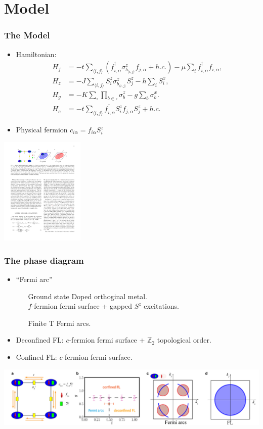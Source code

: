 \documentclass[xcolor=table, 10pt, aspectratio=43]{beamer}
\begin{document}
\section{Model}

\begin{frame}
	\frametitle{The Model}
\begin{itemize}
\item Hamiltonian:
	\begin{align*}
	H_f &= -t\sum_{\langle i,j \rangle} (f^{\dagger}_{i,\alpha} \sigma^{z}_{b_{\langle i,j \rangle}}f_{j,\alpha} + h.c.) -\mu\sum_{i}f^{\dagger}_{i,\alpha}f_{i,\alpha}, \nonumber\\
	H_{z} &= -J \sum_{\langle i,j \rangle} S^{z}_{i} \sigma^{z}_{b_{\langle i,j \rangle}} S^{z}_{j} - h \sum_{i} S^{x}_{i}, \nonumber\\
	H_{g} &= -K \sum_{\square}\prod_{b\in\square} \sigma^{z}_{b} - g\sum_{b} \sigma^{x}_{b}.\\
	H_{c} &= -t \sum_{\langle i,j\rangle} f^{\dagger}_{i,\alpha}S^{z}_{i}f_{j,\alpha}S^{z}_{j} + h.c.
\end{align*}
\item Physical fermion $c_{i\alpha} = f_{i\alpha}S_i^z$
\end{itemize}
\begin{center}
	\includegraphics[width=4cm]{model_l}
\end{center}
\end{frame}

\begin{frame}
	\frametitle{The phase diagram}
	\begin{itemize}
		\item ``Fermi arc''
		\begin{itemize}
			\item[Ground state] Doped orthoginal metal.\\
			$f$-fermion fermi surface + gapped $S^z$ excitations.
			\item[Finite T] Fermi arcs.
		\end{itemize}
		\item Deconfined FL: $c$-fermion fermi surface + $\mathbb Z_2$ topological order.
		\item Confined FL: $c$-fermion fermi surface.
	\end{itemize}
	\includegraphics[width=\textwidth]{doped_pd}
\end{frame}
\end{document}
